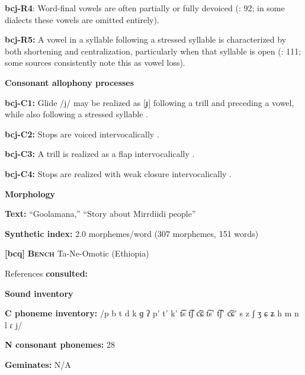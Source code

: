 \textbf{bcj-R4}: Word-final vowels are often partially or fully devoiced (\citealt{Bowern2012}: 92; in some dialects these vowels are omitted entirely).



\textbf{bcj-R5:} A vowel in a syllable following a stressed syllable is characterized by both shortening and centralization, particularly when that syllable is open (\citealt{Bowern2012}: 111; some sources consistently note this as vowel loss).



\textbf{Consonant allophony processes}



\textbf{bcj-C1:} Glide /j/ may be realized as [ɟ] following a trill and preceding a vowel, while also following a stressed syllable \citep[80-1]{Bowern2012}.



\textbf{bcj-C2:}  Stops are voiced intervocalically \citep[76]{Bowern2012}.



\textbf{bcj-C3:} A trill is realized as a flap intervocalically \citep[81]{Bowern2012}.



\textbf{bcj-C4:} Stops are realized with weak closure intervocalically \citep[78]{Bowern2012}.



\textbf{Morphology}



\textbf{Text:} “Goolamana,” “Story about Mirrdiidi people” \citep[704-710]{Bowern2012}



\textbf{Synthetic index:} 2.0 morphemes/word (307 morphemes, 151 words)



\textbf{[bcq]}   \textbf{\textsc{Bench}  }  Ta-Ne-Omotic (Ethiopia)



References \textbf{consulted:} \citet{Rapold2006}



\textbf{Sound inventory}



\textbf{C phoneme inventory:} /p b t d k ɡ ʔ p’ t’ k’ t͡s t͡ʃ c͡ɕ t͡s’ t͡ʃ’ c͡ɕ’ s z ʃ ʒ ɕ ʑ h m n l ɾ j/



\textbf{N consonant phonemes:} 28



\textbf{Geminates:} N/A



